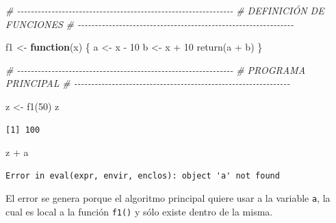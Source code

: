 \documentclass[
]{book}
\newenvironment{Shaded}{\begin{snugshade}}{\end{snugshade}}
\newcommand{\CommentTok}[1]{\textcolor[rgb]{0.56,0.35,0.01}{\textit{#1}}}
\newcommand{\ControlFlowTok}[1]{\textcolor[rgb]{0.13,0.29,0.53}{\textbf{#1}}}
\newcommand{\DecValTok}[1]{\textcolor[rgb]{0.00,0.00,0.81}{#1}}
\newcommand{\FunctionTok}[1]{\textcolor[rgb]{0.00,0.00,0.00}{#1}}
\newcommand{\NormalTok}[1]{#1}
\newcommand{\OtherTok}[1]{\textcolor[rgb]{0.56,0.35,0.01}{#1}}
\newcommand{\SpecialCharTok}[1]{\textcolor[rgb]{0.00,0.00,0.00}{#1}}
\begin{document}
\begin{Shaded}
\begin{Highlighting}[]
\CommentTok{\# {-}{-}{-}{-}{-}{-}{-}{-}{-}{-}{-}{-}{-}{-}{-}{-}{-}{-}{-}{-}{-}{-}{-}{-}{-}{-}{-}{-}{-}{-}{-}{-}{-}{-}{-}{-}{-}{-}{-}{-}{-}{-}{-}{-}{-}{-}{-}{-}{-}{-}{-}{-}{-}{-}{-}{-}{-}{-}{-}{-}{-}{-}{-}}
\CommentTok{\# DEFINICIÓN DE FUNCIONES}
\CommentTok{\# {-}{-}{-}{-}{-}{-}{-}{-}{-}{-}{-}{-}{-}{-}{-}{-}{-}{-}{-}{-}{-}{-}{-}{-}{-}{-}{-}{-}{-}{-}{-}{-}{-}{-}{-}{-}{-}{-}{-}{-}{-}{-}{-}{-}{-}{-}{-}{-}{-}{-}{-}{-}{-}{-}{-}{-}{-}{-}{-}{-}{-}{-}{-}}

\NormalTok{f1 }\OtherTok{\textless{}{-}} \ControlFlowTok{function}\NormalTok{(x) \{}
\NormalTok{    a }\OtherTok{\textless{}{-}}\NormalTok{ x }\SpecialCharTok{{-}} \DecValTok{10}
\NormalTok{    b }\OtherTok{\textless{}{-}}\NormalTok{ x }\SpecialCharTok{+} \DecValTok{10}
    \FunctionTok{return}\NormalTok{(a }\SpecialCharTok{+}\NormalTok{ b)}
\NormalTok{\}}

\CommentTok{\# {-}{-}{-}{-}{-}{-}{-}{-}{-}{-}{-}{-}{-}{-}{-}{-}{-}{-}{-}{-}{-}{-}{-}{-}{-}{-}{-}{-}{-}{-}{-}{-}{-}{-}{-}{-}{-}{-}{-}{-}{-}{-}{-}{-}{-}{-}{-}{-}{-}{-}{-}{-}{-}{-}{-}{-}{-}{-}{-}{-}{-}{-}{-}}
\CommentTok{\# PROGRAMA PRINCIPAL}
\CommentTok{\# {-}{-}{-}{-}{-}{-}{-}{-}{-}{-}{-}{-}{-}{-}{-}{-}{-}{-}{-}{-}{-}{-}{-}{-}{-}{-}{-}{-}{-}{-}{-}{-}{-}{-}{-}{-}{-}{-}{-}{-}{-}{-}{-}{-}{-}{-}{-}{-}{-}{-}{-}{-}{-}{-}{-}{-}{-}{-}{-}{-}{-}{-}{-}}

\NormalTok{z }\OtherTok{\textless{}{-}} \FunctionTok{f1}\NormalTok{(}\DecValTok{50}\NormalTok{)}
\NormalTok{z}
\end{Highlighting}
\end{Shaded}

\begin{verbatim}
[1] 100
\end{verbatim}

\begin{Shaded}
\begin{Highlighting}[]
\NormalTok{z }\SpecialCharTok{+}\NormalTok{ a}
\end{Highlighting}
\end{Shaded}

\begin{verbatim}
Error in eval(expr, envir, enclos): object 'a' not found
\end{verbatim}

El error se genera porque el algoritmo principal quiere usar a la variable \texttt{a}, la cual es local a la función \texttt{f1()} y sólo existe dentro de la misma.
\end{document}
